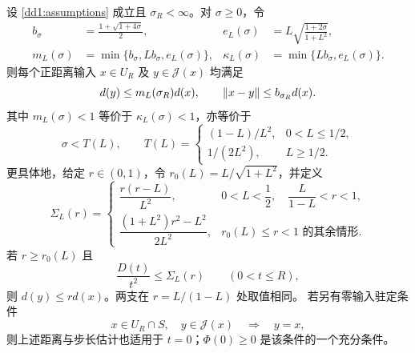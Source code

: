 \begin{theorem}[DD11：由正则性确定允许缺陷]\label{thm:dd1}
设 \eqref{dd1:assumptions} 成立且 $\sigma_R<\infty$。对 $\sigma\ge0$，令
\begin{align}
 b_\sigma&=\frac{1+\sqrt{1+4\sigma}}2,
 &e_L(\sigma)&=L\sqrt{\frac{1+2\sigma}{1+L^2}},\label{dd1:constants}\\
 m_L(\sigma)&=\min\{b_\sigma,Lb_\sigma,e_L(\sigma)\},
 &\kappa_L(\sigma)&=\min\{Lb_\sigma,e_L(\sigma)\}.\label{dd1:factors}
\end{align}
则每个正距离输入 $x\in U_R$ 及 $y\in\mathcal J(x)$ 均满足
\begin{equation}\label{dd1:forward-estimates}
 d(y)\le m_L(\sigma_R)d(x),\qquad
 \lVert x-y\rVert\le b_{\sigma_R}d(x).
\end{equation}
其中 $m_L(\sigma)<1$ 等价于 $\kappa_L(\sigma)<1$，亦等价于
\begin{equation}\label{dd1:threshold}
 \sigma<T(L),\qquad
 T(L)=\begin{cases}
 (1-L)/L^2,&0<L\le1/2,\\[2pt]
 1/(2L^2),&L\ge1/2.
 \end{cases}
\end{equation}
更具体地，给定 $r\in(0,1)$，令 $r_0(L)=L/\sqrt{1+L^2}$，并定义
\begin{equation}\label{dd1:target-bound}
 \Sigma_L(r)=\begin{cases}
 \dfrac{r(r-L)}{L^2},&0<L<\dfrac12,\quad\dfrac{L}{1-L}<r<1,\\[6pt]
 \dfrac{(1+L^2)r^2-L^2}{2L^2},&r_0(L)\le r<1\text{ 的其余情形}.
 \end{cases}
\end{equation}
若 $r\ge r_0(L)$ 且
\begin{equation}\label{dd1:target-condition}
 \frac{D(t)}{t^2}\le\Sigma_L(r)\qquad(0<t\le R),
\end{equation}
则 $d(y)\le r d(x)$。两支在 $r=L/(1-L)$ 处取值相同。
若另有零输入驻定条件
\begin{equation}\label{dd1:stationarity}
 x\in U_R\cap S,\quad y\in\mathcal J(x)\quad\Longrightarrow\quad y=x,
\end{equation}
则上述距离与步长估计也适用于 $t=0$；$\Phi(0)\ge0$ 是该条件的一个充分条件。
\end{theorem}


